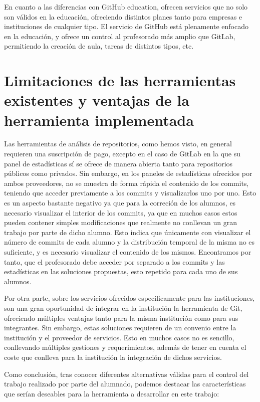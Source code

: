 En cuanto a las diferencias con GitHub education, ofrecen servicios que no
solo son válidos en la educación, ofreciendo distintos planes tanto para
empresas e instituciones de cualquier tipo. El servicio de GitHub está
plenamente enfocado en la educación, y ofrece un control al profesorado más
amplio que GitLab, permitiendo la creación de aula, tareas de distintos
tipos, etc.


\section{Limitaciones de las herramientas existentes y ventajas de la
  herramienta implementada}

Las herramientas de análisis de repositorios, como hemos visto, en general
requieren una suscripción de pago, excepto en el caso de GitLab en la que
su panel de estadísticas sí se ofrece de manera abierta tanto para
repositorios públicos como privados. Sin embargo, en los paneles de
estadísticas ofrecidos por ambos proveedores, no se muestra de forma rápida
el contenido de los commits, teniendo que acceder previamente a los commits
y visualizarlos uno por uno. Esto es un aspecto bastante negativo ya que
para la correción de los alumnos, es necesario visualizar el interior de
los commits, ya que en muchos casos estos pueden contener simples
modificaciones que realmente no conllevan un gran trabajo por parte de
dicho alumno. Esto indica que únicamente con visualizar el número de
commits de cada alumno y la distribución temporal de la misma no es
suficiente, y es necesario visualizar el contenido de los mismos.
Encontramos por tanto, que el profesorado debe acceder por separado a los
commits y las estadísticas en las soluciones propuestas, esto repetido para
cada uno de sus alumnos.

Por otra parte, sobre los servicios ofrecidos especificamente para las
instituciones, son una gran oportunidad de integrar en la institución la
herramienta de Git, ofreciendo múltiples ventajas tanto para la misma
institución como para sus integrantes. Sin embargo, estas soluciones
requieren de un convenio entre la institución y el proveedor de servicios.
Esto en muchos casos no es sencillo, conllevando múltiples gestiones y
requerimientos, además de tener en cuenta el coste que conlleva
para la institución la integración de dichos servicios.

Como conclusión, tras conocer diferentes alternativas válidas para el
control del trabajo realizado por parte del alumnado, podemos destacar las
características que serían deseables para la herramienta a desarrollar en
este trabajo:


